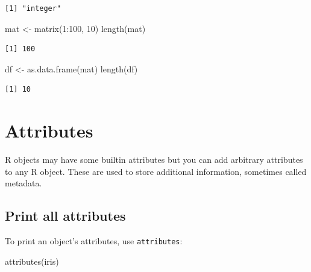 \documentclass[
]{book}
\newenvironment{Shaded}{\begin{snugshade}}{\end{snugshade}}
\newcommand{\DecValTok}[1]{\textcolor[rgb]{0.00,0.00,0.81}{#1}}
\newcommand{\FunctionTok}[1]{\textcolor[rgb]{0.00,0.00,0.00}{#1}}
\newcommand{\NormalTok}[1]{#1}
\newcommand{\OtherTok}[1]{\textcolor[rgb]{0.56,0.35,0.01}{#1}}
\newcommand{\SpecialCharTok}[1]{\textcolor[rgb]{0.00,0.00,0.00}{#1}}
\begin{document}
\begin{verbatim}
[1] "integer"
\end{verbatim}

\begin{Shaded}
\begin{Highlighting}[]
\NormalTok{mat }\OtherTok{\textless{}{-}} \FunctionTok{matrix}\NormalTok{(}\DecValTok{1}\SpecialCharTok{:}\DecValTok{100}\NormalTok{, }\DecValTok{10}\NormalTok{)}
\FunctionTok{length}\NormalTok{(mat)}
\end{Highlighting}
\end{Shaded}

\begin{verbatim}
[1] 100
\end{verbatim}

\begin{Shaded}
\begin{Highlighting}[]
\NormalTok{df }\OtherTok{\textless{}{-}} \FunctionTok{as.data.frame}\NormalTok{(mat)}
\FunctionTok{length}\NormalTok{(df)}
\end{Highlighting}
\end{Shaded}

\begin{verbatim}
[1] 10
\end{verbatim}

\hypertarget{attributes}{%
\section{Attributes}\label{attributes}}

R objects may have some builtin attributes but you can add arbitrary attributes to any R object. These are used to store additional information, sometimes called metadata.

\hypertarget{print-all-attributes}{%
\subsection{Print all attributes}\label{print-all-attributes}}

To print an object's attributes, use \texttt{attributes}:

\begin{Shaded}
\begin{Highlighting}[]
\FunctionTok{attributes}\NormalTok{(iris)}
\end{Highlighting}
\end{Shaded}
\end{document}
